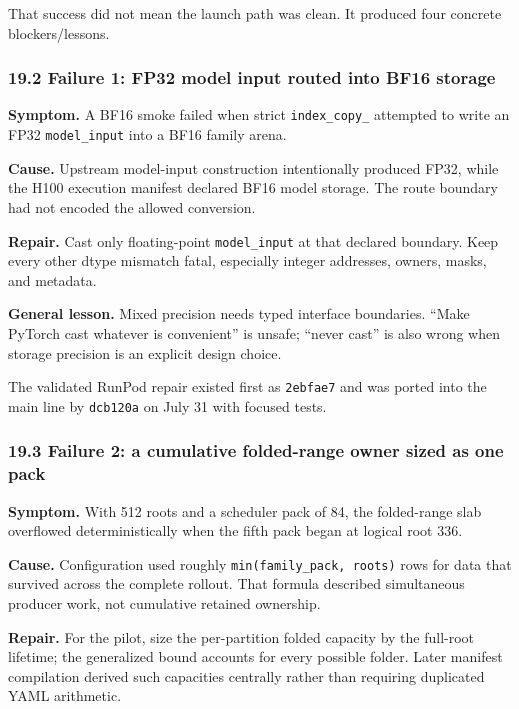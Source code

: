 \documentclass[
  10pt,
  letterpaper,
]{article}
\begin{document}
That success did not mean the launch path was clean. It produced four
concrete blockers/lessons.

\subsubsection{19.2 Failure 1: FP32 model input routed into BF16
storage}\label{192-failure-1-fp32-model-input-routed-into-bf16-storage}

\textbf{Symptom.} A BF16 smoke failed when strict \texttt{index\_copy\_}
attempted to write an FP32 \texttt{model\_input} into a BF16 family
arena.

\textbf{Cause.} Upstream model-input construction intentionally produced
FP32, while the H100 execution manifest declared BF16 model storage. The
route boundary had not encoded the allowed conversion.

\textbf{Repair.} Cast only floating-point \texttt{model\_input} at that
declared boundary. Keep every other dtype mismatch fatal, especially
integer addresses, owners, masks, and metadata.

\textbf{General lesson.} Mixed precision needs typed interface
boundaries. ``Make PyTorch cast whatever is convenient'' is unsafe;
``never cast'' is also wrong when storage precision is an explicit
design choice.

The validated RunPod repair existed first as \texttt{2ebfae7} and was
ported into the main line by \texttt{dcb120a} on July 31 with focused
tests.

\subsubsection{19.3 Failure 2: a cumulative folded-range owner sized as
one
pack}\label{193-failure-2-a-cumulative-folded-range-owner-sized-as-one-pack}

\textbf{Symptom.} With 512 roots and a scheduler pack of 84, the
folded-range slab overflowed deterministically when the fifth pack began
at logical root 336.

\textbf{Cause.} Configuration used roughly
\texttt{min(family\_pack,\ roots)} rows for data that survived across
the complete rollout. That formula described simultaneous producer work,
not cumulative retained ownership.

\textbf{Repair.} For the pilot, size the per-partition folded capacity
by the full-root lifetime; the generalized bound accounts for every
possible folder. Later manifest compilation derived such capacities
centrally rather than requiring duplicated YAML arithmetic.
\end{document}

